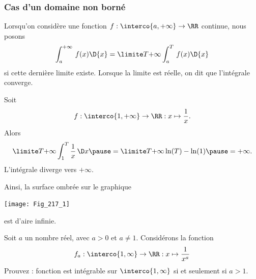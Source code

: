 \subsubsection{Cas d'un domaine non borné}
\begin{frame}
  \begin{definition}
    Lorsqu'on considère une fonction $f: \interco{a,+\infty} \to \RR$ continue, nous posons\pause{}
    \begin{equation*}
      \int_a^{+\infty}\,f(x)\D{x}= \limite T {+\infty} \int_a^T \,f(x)\D{x}
    \end{equation*}
    si cette dernière limite existe.\pause{} Lorsque la limite est réelle, on dit que l'intégrale converge.
  \end{definition}
\end{frame}
\begin{frame}
  \begin{example}
    Soit
    \begin{equation*}
      f : \interco{1,+\infty} \to {\RR} : x \mapsto \frac{1}{x}.
    \end{equation*}\pause
    Alors
    \begin{align*}
      \limite T {+\infty} \int_1^T \dfrac{1}{x} \, \D x\pause =  \limite T {+\infty} \ln(T) - \ln(1)\pause =  + \infty.
    \end{align*}\pause{}
    L'intégrale diverge vers $+ \infty$.
  \end{example}
\end{frame}
\begin{frame}
  Ainsi, la surface ombrée sur le graphique\pause{}
  \begin{center}
    \texttt{[image: Fig\_217\_1]}
  \end{center}\pause{}
  est d'aire infinie.
\end{frame}
\begin{frame}
  \begin{exercise}
    Soit \(a\) un nombre réel, avec \(a > 0\) et \(a \neq 1\). Considérons la fonction
    \begin{equation*}
      f_{a} : \interco{1,\infty} \rightarrow {\RR} : x \mapsto \frac{1}{x^{a}}
    \end{equation*}\pause{}
    Prouvez \pause{}: fonction est intégrable sur \(\interco{1,\infty}\) si et seulement si \(a > 1\).
  \end{exercise}
\end{frame}
